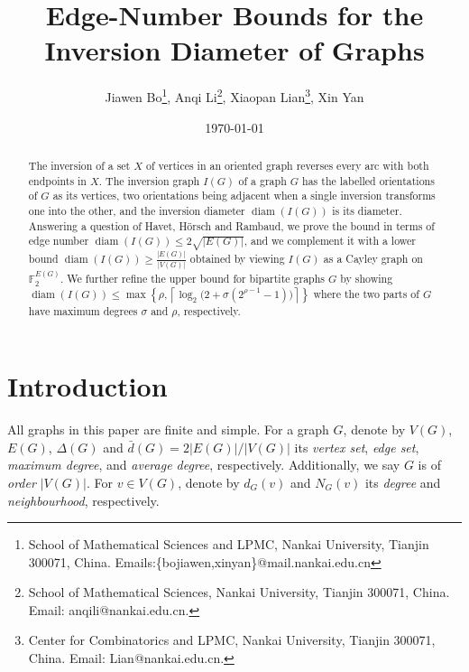 \documentclass[11pt]{article}
\title{Edge-Number Bounds for the Inversion Diameter of Graphs}
\author{Jiawen Bo\thanks{School of Mathematical Sciences and LPMC, Nankai University, Tianjin 300071, China. Emails:\{bojiawen,xinyan\}@mail.nankai.edu.cn},
Anqi Li\thanks{School of Mathematical Sciences, Nankai University, Tianjin 300071, China. Email: anqili@nankai.edu.cn.},
Xiaopan Lian\thanks{Center for Combinatorics and LPMC, Nankai University, Tianjin 300071, 
China. Email: Lian@nankai.edu.cn.}, 
Xin Yan\footnotemark[1]
}
\date{\today}
\theoremstyle{remark}
\DeclareMathOperator{\diam}{diam}
\newcommand{\F}{\mathbb{F}}
\begin{document}
\maketitle

\begin{abstract}
The inversion of a set $X$ of vertices in an oriented graph reverses every arc with both endpoints in $X$.
The inversion graph $I(G)$ of a graph $G$ has the labelled orientations of $G$ as its vertices, two orientations being adjacent when a single inversion transforms one into the other, and the inversion diameter $\diam(I(G))$ is its diameter.
Answering a question of Havet, H\"orsch and Rambaud, we prove the  bound in terms of edge number $\diam(I(G)) \le 2\sqrt{|E(G)|}$,
and we complement it with a lower bound $\diam(I(G)) \ge \frac{|E(G)|}{|V(G)|}$
obtained by viewing $I(G)$ as a Cayley graph on $\F_2^{E(G)}$. We further refine the upper bound for bipartite graphs $G$ by showing   
 $ \diam(I(G))\le \max\left\{\rho,
  \left\lceil\log_2\bigl(2+\sigma(2^{\rho-1}-1)\bigr)\right\rceil\right\}$
where the two parts of $G$ have maximum degrees $\sigma$ and $\rho$, respectively. 



\end{abstract}

\section{Introduction}

All graphs in this paper are finite and simple. For a graph $G$, denote by $V(G)$, $E(G)$, $\Delta(G)$  and  $\bar d(G)=2|E(G)|/|V(G)|$  its {\it vertex set},   {\it edge set},  {\it maximum degree}, and {\it average degree}, respectively. Additionally, we say $G$ is of {\it order} $|V(G)|$.  For $v\in V(G)$, denote by  $d_G(v)$ and  $N_G(v)$ its {\it degree} and {\it neighbourhood}, respectively.  
\end{document}
